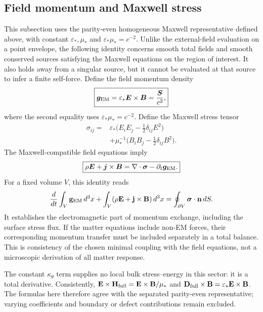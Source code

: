 \documentclass[11pt]{article}
\begin{document}
\subsection{Field momentum and Maxwell stress}

This subsection uses the parity-even homogeneous Maxwell representative defined above, with constant $\varepsilon_*,\mu_*$ and $\varepsilon_*\mu_*=c^{-2}$. Unlike the external-field evaluation on a point envelope, the following identity concerns smooth total fields and smooth conserved sources satisfying the Maxwell equations on the region of interest. It also holds away from a singular source, but it cannot be evaluated at that source to infer a finite self-force. Define the field momentum density
\begin{equation}
\boxed{
\bm g_{\rm EM}
=
\varepsilon_*\bm E\times\bm B
=
\frac{\bm S}{c^2},
}
\end{equation}
where the second equality uses $\varepsilon_*\mu_*=c^{-2}$. Define the Maxwell stress tensor
\begin{equation}
\boxed{
\begin{aligned}
\sigma_{ij}={}&\varepsilon_*
\bigl(E_iE_j-\tfrac12\delta_{ij}E^2\bigr)\\
&+\mu_*^{-1}
\bigl(B_iB_j-\tfrac12\delta_{ij}B^2\bigr).
\end{aligned}
}
\end{equation}
The Maxwell-compatible field equations imply
\begin{equation}
\boxed{
\rho\bm E+\bm j\times\bm B
=
\nabla\cdot\bm\sigma
-
\partial_t\bm g_{\rm EM}.
}
\end{equation}
For a fixed volume $V$, this identity reads
\begin{equation}
\frac{d}{dt}\int_V\mathbf g_{\rm EM}\,d^3x
+\int_V(\rho\mathbf E+\mathbf j\times\mathbf B)\,d^3x
=\oint_{\partial V}\boldsymbol\sigma\cdot\mathbf n\,dS.
\end{equation}
It establishes the electromagnetic part of momentum exchange, including the surface stress flux. If the matter equations include non-EM forces, their corresponding momentum transfer must be included separately in a total balance. This is consistency of the chosen minimal coupling with the field equations, not a microscopic derivation of all matter response.

The constant $\kappa_\theta$ term supplies no local bulk stress--energy in this sector: it is a total derivative. Consistently, $\mathbf E\times\mathbf H_{\rm full}=\mathbf E\times\mathbf B/\mu_*$ and $\mathbf D_{\rm full}\times\mathbf B=\varepsilon_*\mathbf E\times\mathbf B$. The formulas here therefore agree with the separated parity-even representative; varying coefficients and boundary or defect contributions remain excluded.
\end{document}
